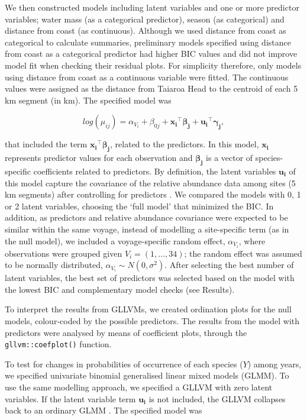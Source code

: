 \documentclass[preprint, 3p, authoryear]{elsarticle} %
\begin{document}
We then constructed models including latent variables and one or more predictor variables; water mass (as a categorical predictor), season (as categorical) and distance from coast (as continuous). Although we used distance from coast as categorical to calculate summaries, preliminary models specified using distance from coast as a categorical predictor had higher BIC values and did not improve model fit when checking their residual plots. For simplicity therefore, only models using distance from coast as a continuous variable were fitted. The continuous values were assigned as the distance from Taiaroa Head to the centroid of each 5 km segment (in km). The specified model was

\[
log(\mu_{ij}) = \alpha_{V_i} + \beta_{0j} + \mathbf{x_i}^\top \mathbf{\beta_j} + \mathbf{u_i}^\top \mathbf{\gamma_j},
\]

\noindent
that included the term \(\mathbf{x_i}^\top \mathbf{\beta_j}\), related to the predictors. In this model, \(\mathbf{x_i}\) represents predictor values for each observation and \(\mathbf{\beta_j}\) is a vector of species-specific coefficients related to predictors. By definition, the latent variables \(\mathbf{u_i}\) of this model capture the covariance of the relative abundance data among sites (5 km segments) after controlling for predictors \citep{niku2019}. We compared the models with 0, 1 or 2 latent variables, choosing the `full model' that minimized the BIC. In addition, as predictors and relative abundance covariance were expected to be similar within the same voyage, instead of modelling a site-specific term (as in the null model), we included a voyage-specific random effect, \(\alpha_{V_i}\), where observations were grouped given \(V_i = (1, ..., 34)\); the random effect was assumed to be normally distributed, \(\alpha_{V_i} \sim N(0, \sigma^2)\). After selecting the best number of latent variables, the best set of predictors was selected based on the model with the lowest BIC and complementary model checks (see Results).

To interpret the results from GLLVMs, we created ordination plots for the null models, colour-coded by the possible predictors. The results from the model with predictors were analysed by means of coefficient plots, through the \texttt{gllvm::coefplot()} function.

To test for changes in probabilities of occurrence of each species (\(Y\)) among years, we specified univariate binomial generalised linear mixed models (GLMM). To use the same modelling approach, we specified a GLLVM with zero latent variables. If the latent variable term \(\mathbf{u_i}\) is not included, the GLLVM collapses back to an ordinary GLMM \citep{warton2015}. The specified model was
\end{document}
